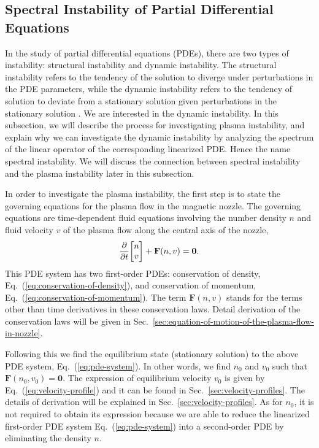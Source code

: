 \subsection{Spectral Instability of Partial Differential Equations}
In the study of partial differential equations (PDEs), there are two types of instability: structural instability and dynamic instability. The structural instability refers to the tendency of the solution to diverge under perturbations in the PDE parameters, while the dynamic instability refers to the tendency of solution to deviate from a stationary solution given perturbations in the stationary solution \cite{beck_spectral_2020}. We are interested in the dynamic instability. In this subsection, we will describe the process for investigating plasma instability, and explain why we can investigate the dynamic instability by analyzing the spectrum of the linear operator of the corresponding linearized PDE. Hence the name spectral instability. We will discuss the connection between spectral instability and the plasma instability later in this subsection.

In order to investigate the plasma instability, the first step is to state the governing equations for the plasma flow in the magnetic nozzle. The governing equations are time-dependent fluid equations involving the number density $n$ and fluid velocity $v$ of the plasma flow along the central axis of the nozzle,
\begin{equation}
	\pdv{t}\mqty[n\\ v] + \mathbf{F}(n,v) = \mathbf{0}.
	\label{eq:pde-system}
\end{equation}
This PDE system has two first-order PDEs: conservation of density, Eq.~(\ref{eq:conservation-of-density}), and conservation of momentum, Eq.~(\ref{eq:conservation-of-momentum}). The term $\mathbf{F}(n,v)$ stands for the terms other than time derivatives in these conservation laws. Detail derivation of the conservation laws will be given in Sec.~\ref{sec:equation-of-motion-of-the-plasma-flow-in-nozzle}.

Following this we find the equilibrium state (stationary solution) to the above PDE system, Eq.~(\ref{eq:pde-system}). In other words, we find $n_0$ and $v_0$ such that $\mathbf{F}(n_0,v_0)=\mathbf{0}$. The expression of equilibrium velocity $v_0$ is given by Eq.~(\ref{eq:velocity-profile}) and it can be found in Sec.~\ref{sec:velocity-profiles}. The details of derivation will be explained in Sec.~\ref{sec:velocity-profiles}. As for $n_0$, it is not required to obtain its expression because we are able to reduce the linearized first-order PDE system Eq.~(\ref{eq:pde-system}) into a second-order PDE by eliminating the density $n$.

